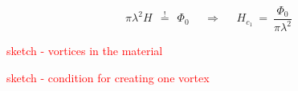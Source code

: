 \documentclass[10pt]{report}
\numberwithin{equation}{chapter}
\begin{document}
\begin{equation}
  \pi \lambda^2 H ~~\overset{!}{=}~~ \Phi_0 ~~~~~~\Rightarrow~~~~~~ H_{c_1} ~=~ \frac{\Phi_0}{\pi \lambda^2}
\end{equation}




\textcolor{red}{sketch - vortices in the material}

\textcolor{red}{sketch - condition for creating one vortex}




\end{document}
